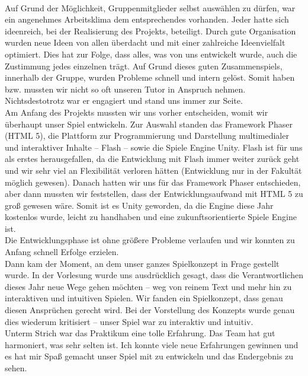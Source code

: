 \documentclass[10pt,a4paper,notitlepage]{report}
\begin{document}
	\\\par\medskip\Text
	Auf Grund der Möglichkeit, Gruppenmitglieder selbst auswählen zu dürfen, war ein angenehmes Arbeitsklima dem entsprechendes vorhanden. Jeder hatte sich ideenreich, bei der Realisierung des Projekts, beteiligt. Durch gute Organisation wurden neue Ideen von allen überdacht und mit einer zahlreiche Ideenvielfalt optimiert. Dies hat zur Folge, dass alles, was von uns entwickelt wurde, auch die Zustimmung jedes einzelnen trägt. Auf Grund dieses guten Zusammenspiels, innerhalb der Gruppe, wurden Probleme schnell und intern gelöst. Somit haben bzw. mussten wir nicht so oft unseren Tutor in Anspruch nehmen. Nichtsdestotrotz war er engagiert und stand uns immer zur Seite.\\
	Am Anfang des Projekts mussten wir uns vorher entscheiden, womit wir überhaupt unser Spiel entwickeln. Zur Auswahl standen das Framework Phaser (HTML 5), die Plattform zur Programmierung und Darstellung multimedialer und interaktiver Inhalte – Flash – sowie die Spiele Engine Unity. Flash ist für uns als erstes herausgefallen, da die Entwicklung mit Flash immer weiter zurück geht und wir sehr viel an Flexibilität verloren hätten (Entwicklung nur in der Fakultät möglich gewesen). Danach hatten wir uns für das Framework Phaser entschieden, aber dann mussten wir feststellen, dass der Entwicklungsaufwand mit HTML 5 zu groß gewesen wäre. Somit ist es Unity geworden, da die Engine diese Jahr kostenlos wurde, leicht zu handhaben und eine zukunftsorientierte Spiele Engine ist.\\ 
	Die Entwicklungsphase ist ohne größere Probleme verlaufen und wir konnten zu Anfang schnell Erfolge erzielen.\\ 
	Dann kam der Moment, an dem unser ganzes Spielkonzept in Frage gestellt wurde. In der Vorlesung wurde uns ausdrücklich gesagt, dass die Verantwortlichen dieses Jahr neue Wege gehen möchten – weg von reinem Text und mehr hin zu interaktiven und intuitiven Spielen. Wir fanden ein Spielkonzept, dass genau diesen Ansprüchen gerecht wird. Bei der Vorstellung des Konzepts wurde  genau dies wiederum kritisiert – unser Spiel war zu interaktiv und intuitiv.\\
	Unterm Strich war das Praktikum eine tolle Erfahrung. Das Team hat gut harmoniert, was sehr selten ist. Ich konnte viele neue Erfahrungen gewinnen und es hat mir Spaß gemacht unser Spiel mit zu entwickeln und das Endergebnis zu sehen.\\\par\smallskip
\end{document}
